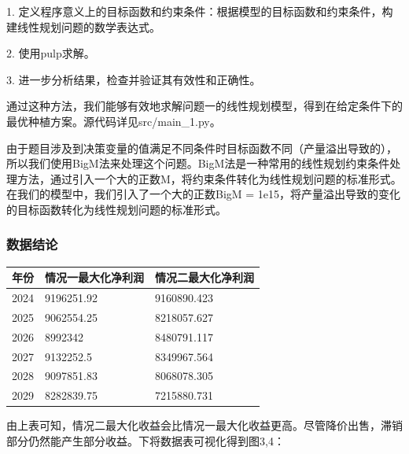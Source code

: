 \documentclass{cumcmthesis}
\begin{document}
1. 定义程序意义上的目标函数和约束条件：根据模型的目标函数和约束条件，构建线性规划问题的数学表达式。

2. 使用pulp求解。

3. 进一步分析结果，检查并验证其有效性和正确性。

通过这种方法，我们能够有效地求解问题一的线性规划模型，得到在给定条件下的最优种植方案。源代码详见src/main\_1.py。

由于题目涉及到决策变量的值满足不同条件时目标函数不同（产量溢出导致的），所以我们使用BigM法来处理这个问题。BigM法是一种常用的线性规划约束条件处理方法，通过引入一个大的正数M，将约束条件转化为线性规划问题的标准形式。在我们的模型中，我们引入了一个大的正数BigM = 1e15，将产量溢出导致的变化的目标函数转化为线性规划问题的标准形式。

\subsubsection{数据结论}

\begin{table}[H]
    \centering
    \begin{tabular}{|l|l|l|}
    \hline
    \textbf{年份} & \textbf{情况一最大化净利润} & \textbf{情况二最大化净利润}  \\ \hline
        2024 & 9196251.92 & 9160890.423  \\ \hline
        2025 & 9062554.25 & 8218057.627  \\ \hline
        2026 & 8992342 & 8480791.117  \\ \hline
        2027 & 9132252.5 & 8349967.564  \\ \hline
        2028 & 9097851.83 & 8068078.305  \\ \hline
        2029 & 8282839.75 & 7215880.731  \\ \hline
    \end{tabular}
\end{table}
由上表可知，情况二最大化收益会比情况一最大化收益更高。尽管降价出售，滞销部分仍然能产生部分收益。下将数据表可视化得到图3,4：
\end{document}
